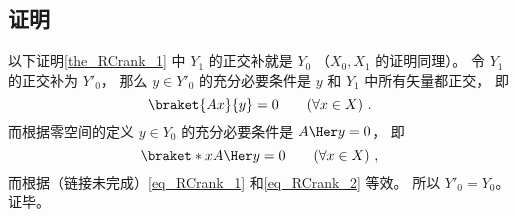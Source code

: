 \subsection{证明}
以下证明\autoref{the_RCrank_1} 中 $Y_1$ 的正交补就是 $Y_0$ （$X_0, X_1$ 的证明同理）。 令 $Y_1$ 的正交补为 $Y'_0$， 那么 $y \in Y'_0$ 的充分必要条件是 $y$ 和 $Y_1$ 中所有矢量都正交， 即
\begin{equation}\label{eq_RCrank_1}
\braket{Ax}{y} = 0 \qquad (\forall x \in X)~.
\end{equation}
而根据零空间的定义 $y \in Y_0$ 的充分必要条件是 $A\Her y = 0$， 即
\begin{equation}\label{eq_RCrank_2}
\braket*{x}{A\Her y} = 0 \qquad (\forall x \in X)~,
\end{equation}
而根据（链接未完成）\autoref{eq_RCrank_1} 和\autoref{eq_RCrank_2} 等效。 所以 $Y'_0 = Y_0$。 证毕。
